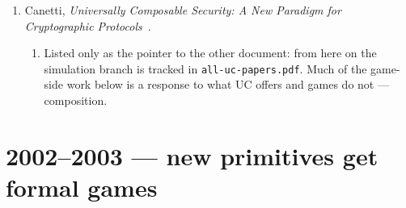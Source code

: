 \documentclass[11pt]{article}
\newcommand{\paper}[3]{#1, \emph{#2}~\cite{#3}.}
\begin{document}
\begin{enumerate}
  \item \paper{Canetti}{Universally Composable Security: A New Paradigm for
    Cryptographic Protocols}{Can01}
    \begin{enumerate}
      \item Listed only as the pointer to the other document: from here on the
        simulation branch is tracked in \texttt{all-uc-papers.pdf}. Much of the
        game-side work below is a response to what UC offers and games do not
        --- composition.
    \end{enumerate}
\end{enumerate}

\section{2002--2003 --- new primitives get formal games}
\end{document}
